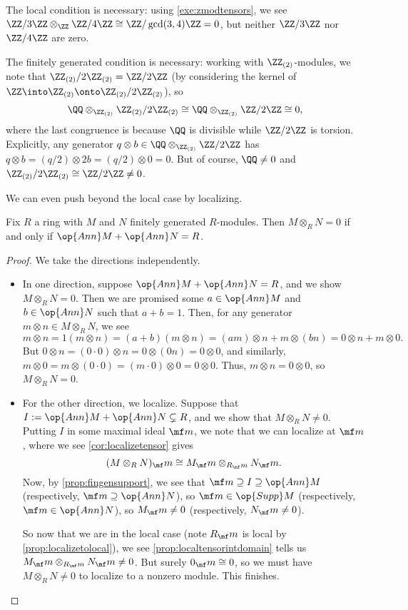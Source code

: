 \begin{remark}[Nir]
	The local condition is necessary: using \autoref{exe:zmodtensors}, we see $\ZZ/3\ZZ\otimes_\ZZ\ZZ/4\ZZ\cong\ZZ/\gcd(3,4)\ZZ=0$, but neither $\ZZ/3\ZZ$ nor $\ZZ/4\ZZ$ are zero.
\end{remark}
\begin{remark}[Nir] \label{rem:fingentensordomain}
	The finitely generated condition is necessary: working with $\ZZ_{(2)}$-modules, we note that $\ZZ_{(2)}/2\ZZ_{(2)}=\ZZ/2\ZZ$ (by considering the kernel of $\ZZ\into\ZZ_{(2)}\onto\ZZ_{(2)}/2\ZZ_{(2)}$), so
	\[\QQ\otimes_{\ZZ_{(2)}}\ZZ_{(2)}/2\ZZ_{(2)}\cong\QQ\otimes_{\ZZ_{(2)}}\ZZ/2\ZZ\cong0,\]
	where the last congruence is because $\QQ$ is divisible while $\ZZ/2\ZZ$ is torsion. Explicitly, any generator $q\otimes b\in\QQ\otimes_{\ZZ_{(2)}}\ZZ/2\ZZ$ has $q\otimes b=(q/2)\otimes2b=(q/2)\otimes0=0$. But of course, $\QQ\ne0$ and $\ZZ_{(2)}/2\ZZ_{(2)}\cong\ZZ/2\ZZ\ne0$.
\end{remark}
We can even push beyond the local case by localizing.
\begin{corollary}
	Fix $R$ a ring with $M$ and $N$ finitely generated $R$-modules. Then $M\otimes_RN=0$ if and only if $\op{Ann}M+\op{Ann}N=R$.
\end{corollary}
\begin{proof}
	We take the directions independently.
	\begin{itemize}
		\item In one direction, suppose $\op{Ann}M+\op{Ann}N=R$, and we show $M\otimes_RN=0$. Then we are promised some $a\in\op{Ann}M$ and $b\in\op{Ann}N$ such that $a+b=1$. Then, for any generator $m\otimes n\in M\otimes_RN$, we see
		\[m\otimes n=1(m\otimes n)=(a+b)(m\otimes n)=(am)\otimes n+m\otimes(bn)=0\otimes n+m\otimes0.\]
		But $0\otimes n=(0\cdot0)\otimes n=0\otimes(0n)=0\otimes0$, and similarly, $m\otimes0=m\otimes(0\cdot0)=(m\cdot0)\otimes0=0\otimes0$. Thus, $m\otimes n=0\otimes0$, so $M\otimes_RN=0$.
		
		\item For the other direction, we localize. Suppose that $I:=\op{Ann}M+\op{Ann}N\subsetneq R$, and we show that $M\otimes_RN\ne0$. Putting $I$ in some maximal ideal $\mf m$, we note that we can localize at $\mf m$, where we see \autoref{cor:localizetensor} gives
		\[(M\otimes_RN)_\mf m\cong M_\mf m\otimes_{R_\mf m}N_\mf m.\]
		Now, by \autoref{prop:fingensupport}, we see that $\mf m\supseteq I\supseteq\op{Ann}M$ (respectively, $\mf m\supseteq\op{Ann}N$), so $\mf m\in\op{Supp}M$ (respectively, $\mf m\in\op{Ann}N$), so $M_\mf m\ne0$ (respectively, $N_\mf m\ne0$).

		So now that we are in the local case (note $R_\mf m$ is local by \autoref{prop:localizetolocal}), we see \autoref{prop:localtensorintdomain} tells us $M_\mf m\otimes_{R_\mf m}N_\mf m\ne0$. But surely $0_\mf m\cong 0$, so we must have $M\otimes_RN\ne0$ to localize to a nonzero module. This finishes.
		\qedhere
	\end{itemize}
\end{proof}
